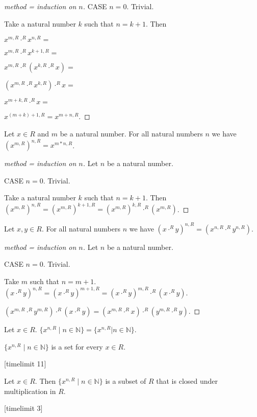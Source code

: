 \documentclass[11pt]{article}
\newcommand{\powers}[2]{\{{#1}^{n,#2} \mid n \in \mathbb{N}\}}
\begin{document}
\begin{forthel}
\begin{proof}[method = induction on $n$]
CASE $n = 0$. Trivial.

Take a natural number $k$ such that $n = k + 1$.
Then

$x^{m,R} \cdot^{R} x^{n,R} = $

$x^{m,R} \cdot^{R} x^{k+1,R} = $

$x^{m,R} \cdot^{R} (x^{k,R} \cdot^{R} x) = $

$(x^{m,R} \cdot^{R} x^{k,R}) \cdot^{R} x = $

$x^{m + k,R} \cdot^{R} x = $

$x^{(m + k)+1,R} = x^{m+n,R}.$
\end{proof}

\begin{lemma} Let $x \in R$ and $m$ be a natural number.
For all natural numbers $n$
we have
$(x^{m,R})^{n,R} = x^{m * n,R}$.
\end{lemma}
\begin{proof}[method = induction on $n$]
Let $n$ be a natural number.

CASE $n = 0$. Trivial.

Take a natural number $k$ such that $n = k + 1$. Then
$(x^{m,R})^{n,R} =
(x^{m,R})^{k+1,R} =
(x^{m,R})^{k,R} \cdot^{R} (x^{m,R})$.
\end{proof}

\begin{lemma} Let $x,y \in R$. For all natural numbers
$n$ we have
$(x \cdot^{R} y)^{n,R} = (x^{n,R} \cdot^{R} y^{n,R})$.
\end{lemma}
\begin{proof}[method = induction on $n$]
Let $n$ be a natural number.

CASE $n = 0$. Trivial.

Take $m$ such that $n = m + 1$.
$(x \cdot^{R} y)^{n,R} =
(x \cdot^{R} y)^{m+1,R} =
(x \cdot^{R} y)^{m,R} \cdot^{R} (x \cdot^{R} y).$

$(x^{m,R} \cdot^{R} y^{m,R}) \cdot^{R} (x \cdot^{R} y) =
(x^{m,R} \cdot^{R} x) \cdot^{R} ( y^{m,R} \cdot^{R} y)$.
\end{proof}

\begin{definition} Let $x \in R$. $\powers{x}{R} = \{x^{n,R} | n \in \mathbb{N} \} $.
\end{definition}

\begin{lemma} $\powers{x}{R}$ is a set for every $x \in R$.
\end{lemma}

[timelimit 11]
\begin{lemma} Let $x \in R$. Then
$\powers{x}{R}$ is a subset of $R$ that is closed under multiplication in $R$.
\end{lemma}
[timelimit 3]


\end{forthel}
\end{document}
